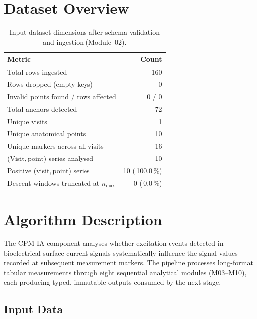\documentclass[a4paper,11pt]{article}
\begin{document}
\section{Dataset Overview}

\begin{table}[h!]
\centering
\small
\caption{Input dataset dimensions after schema validation and ingestion (Module~02).}
\begin{tabular}{lr}
\toprule
\textbf{Metric} & \textbf{Count} \\
\midrule
Total rows ingested                        & 160 \\
Rows dropped (empty keys)                  & 0 \\
Invalid points found / rows affected       & 0 / 0 \\
Total anchors detected                     & 72 \\
Unique visits                          & 1 \\
Unique anatomical points               & 10 \\
Unique markers across all visits       & 16 \\
(Visit,\,point) series analysed        & 10 \\
Positive (visit,\,point) series        & 10 (\,100.0\,\%) \\
Descent windows truncated at $n_{\max}$ & 0 (\,0.0\,\%) \\
\bottomrule
\end{tabular}
\end{table}

\section{Algorithm Description}

The CPM-IA component analyses whether excitation events detected in bioelectrical surface
current signals systematically influence the signal values recorded at subsequent measurement
markers. The pipeline processes long-format tabular measurements through eight sequential
analytical modules (M03--M10), each producing typed, immutable outputs consumed by the next
stage.

\subsection{Input Data}
\end{document}

